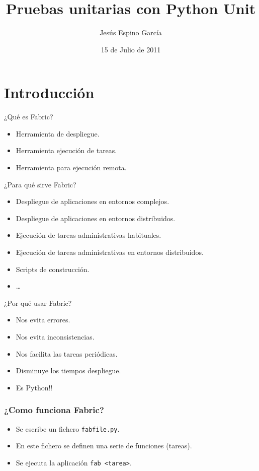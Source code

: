 \documentclass[10pt]{beamer}
\title{Pruebas unitarias con Python Unit}
\author{Jesús Espino García}
\date{15 de Julio de 2011}
\institute[Python Madrid 2011]{Kaleidos\\Python Madrid 2011}
\begin{document}
  \frame{\maketitle}


  \section*{Introducción}
  \begin{frame}{¿Qué es Fabric?}
    \begin{itemize}
      \item Herramienta de despliegue.
      \item Herramienta ejecución de tareas.
      \item Herramienta para ejecución remota.
    \end{itemize}
  \end{frame}
  
  \begin{frame}{¿Para qué sirve Fabric?}
    \begin{itemize}
      \item Despliegue de aplicaciones en entornos complejos.
      \item Despliegue de aplicaciones en entornos distribuidos.
      \item Ejecución de tareas administrativas habituales.
      \item Ejecución de tareas administrativas en entornos distribuidos.
      \item Scripts de construcción.
      \item \dots{}
    \end{itemize}
  \end{frame}
  
  \begin{frame}{¿Por qué usar Fabric?}
    \begin{itemize}
      \item Nos evita errores.
      \item Nos evita inconsistencias.
      \item Nos facilita las tareas periódicas.
      \item Disminuye los tiempos despliegue.
      \item Es Python!!
    \end{itemize}
  \end{frame}

  \begin{frame}[containsverbatim]
    \frametitle{¿Como funciona Fabric?}
    \begin{itemize}
      \item Se escribe un fichero \verb+fabfile.py+.
      \item En este fichero se definen una serie de funciones (tareas).
      \item Se ejecuta la aplicación \verb+fab <tarea>+.
    \end{itemize}
  \end{frame}
  
\end{document}
